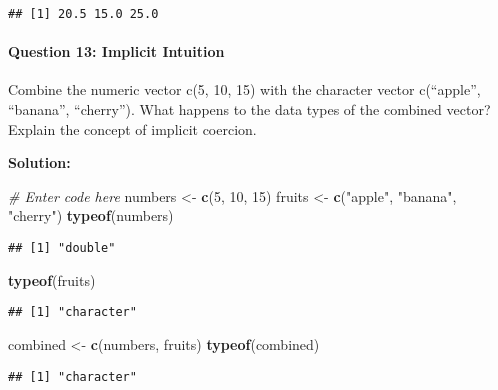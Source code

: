 \documentclass[
]{article}
\newenvironment{Shaded}{\begin{snugshade}}{\end{snugshade}}
\newcommand{\CommentTok}[1]{\textcolor[rgb]{0.56,0.35,0.01}{\textit{#1}}}
\newcommand{\DecValTok}[1]{\textcolor[rgb]{0.00,0.00,0.81}{#1}}
\newcommand{\FunctionTok}[1]{\textcolor[rgb]{0.13,0.29,0.53}{\textbf{#1}}}
\newcommand{\NormalTok}[1]{#1}
\newcommand{\OtherTok}[1]{\textcolor[rgb]{0.56,0.35,0.01}{#1}}
\newcommand{\StringTok}[1]{\textcolor[rgb]{0.31,0.60,0.02}{#1}}
\begin{document}
\begin{verbatim}
## [1] 20.5 15.0 25.0
\end{verbatim}

\hypertarget{question-13-implicit-intuition}{%
\paragraph{Question 13: Implicit
Intuition}\label{question-13-implicit-intuition}}

Combine the numeric vector c(5, 10, 15) with the character vector
c(``apple'', ``banana'', ``cherry''). What happens to the data types of
the combined vector? Explain the concept of implicit coercion.

\textbf{Solution:}

\begin{Shaded}
\begin{Highlighting}[]
\CommentTok{\# Enter code here}
\NormalTok{numbers }\OtherTok{\textless{}{-}} \FunctionTok{c}\NormalTok{(}\DecValTok{5}\NormalTok{, }\DecValTok{10}\NormalTok{, }\DecValTok{15}\NormalTok{) }
\NormalTok{fruits }\OtherTok{\textless{}{-}} \FunctionTok{c}\NormalTok{(}\StringTok{"apple"}\NormalTok{, }\StringTok{"banana"}\NormalTok{, }\StringTok{"cherry"}\NormalTok{)}
\FunctionTok{typeof}\NormalTok{(numbers)}
\end{Highlighting}
\end{Shaded}

\begin{verbatim}
## [1] "double"
\end{verbatim}

\begin{Shaded}
\begin{Highlighting}[]
\FunctionTok{typeof}\NormalTok{(fruits)}
\end{Highlighting}
\end{Shaded}

\begin{verbatim}
## [1] "character"
\end{verbatim}

\begin{Shaded}
\begin{Highlighting}[]
\NormalTok{combined }\OtherTok{\textless{}{-}} \FunctionTok{c}\NormalTok{(numbers, fruits)}
\FunctionTok{typeof}\NormalTok{(combined)}
\end{Highlighting}
\end{Shaded}

\begin{verbatim}
## [1] "character"
\end{verbatim}
\end{document}
